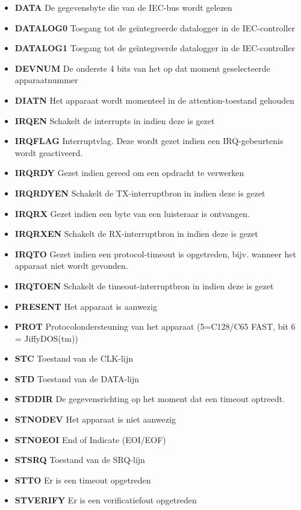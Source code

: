 \begin{itemize}
\item{\bf{DATA}} De gegevensbyte die van de IEC-bus wordt gelezen
\item{\bf{DATALOG0}} Toegang tot de geïntegreerde datalogger in de IEC-controller
\item{\bf{DATALOG1}} Toegang tot de geïntegreerde datalogger in de IEC-controller
\item{\bf{DEVNUM}} De onderste 4 bits van het op dat moment geselecteerde apparaatnummer
\item{\bf{DIATN}} Het apparaat wordt momenteel in de attention-toestand gehouden
\item{\bf{IRQEN}} Schakelt de interrupts in indien deze is gezet
\item{\bf{IRQFLAG}} Interruptvlag. Deze wordt gezet indien een IRQ-gebeurtenis wordt geactiveerd.
\item{\bf{IRQRDY}} Gezet indien gereed om een opdracht te verwerken
\item{\bf{IRQRDYEN}} Schakelt de TX-interruptbron in indien deze is gezet
\item{\bf{IRQRX}} Gezet indien een byte van een luisteraar is ontvangen.
\item{\bf{IRQRXEN}} Schakelt de RX-interruptbron in indien deze is gezet
\item{\bf{IRQTO}} Gezet indien een protocol-timeout is opgetreden, bijv. wanneer het apparaat niet wordt gevonden.
\item{\bf{IRQTOEN}} Schakelt de timeout-interruptbron in indien deze is gezet
\item{\bf{PRESENT}} Het apparaat is aanwezig
\item{\bf{PROT}} Protocolondersteuning van het apparaat (5=C128/C65 FAST, bit 6 = JiffyDOS(tm))
\item{\bf{STC}} Toestand van de CLK-lijn
\item{\bf{STD}} Toestand van de DATA-lijn
\item{\bf{STDDIR}} De gegevensrichting op het moment dat een timeout optreedt.
\item{\bf{STNODEV}} Het apparaat is niet aanwezig
\item{\bf{STNOEOI}} End of Indicate (EOI/EOF)
\item{\bf{STSRQ}} Toestand van de SRQ-lijn
\item{\bf{STTO}} Er is een timeout opgetreden
\item{\bf{STVERIFY}} Er is een verificatiefout opgetreden
\end{itemize}
